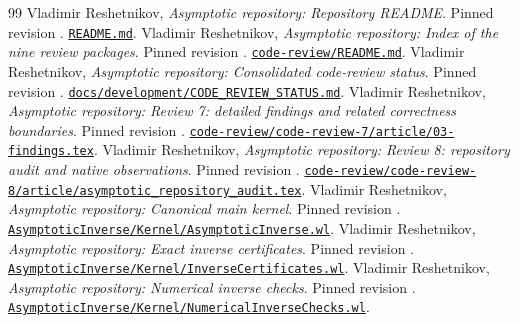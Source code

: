 \begin{thebibliography}{99}
\small
\setlength{\itemsep}{0.4em}
 Vladimir Reshetnikov, \emph{Asymptotic repository: Repository README}. Pinned revision . \href{https://github.com/VladimirReshetnikov/Asymptotic/blob/921387e5ba1239bfda96e63e64e89bf63d9c41e6/README.md}{\nolinkurl{README.md}}.
 Vladimir Reshetnikov, \emph{Asymptotic repository: Index of the nine review packages}. Pinned revision . \href{https://github.com/VladimirReshetnikov/Asymptotic/blob/921387e5ba1239bfda96e63e64e89bf63d9c41e6/code-review/README.md}{\nolinkurl{code-review/README.md}}.
 Vladimir Reshetnikov, \emph{Asymptotic repository: Consolidated code-review status}. Pinned revision . \href{https://github.com/VladimirReshetnikov/Asymptotic/blob/921387e5ba1239bfda96e63e64e89bf63d9c41e6/docs/development/CODE_REVIEW_STATUS.md}{\nolinkurl{docs/development/CODE_REVIEW_STATUS.md}}.
 Vladimir Reshetnikov, \emph{Asymptotic repository: Review 7: detailed findings and related correctness boundaries}. Pinned revision . \href{https://github.com/VladimirReshetnikov/Asymptotic/blob/921387e5ba1239bfda96e63e64e89bf63d9c41e6/code-review/code-review-7/article/03-findings.tex}{\nolinkurl{code-review/code-review-7/article/03-findings.tex}}.
 Vladimir Reshetnikov, \emph{Asymptotic repository: Review 8: repository audit and native observations}. Pinned revision . \href{https://github.com/VladimirReshetnikov/Asymptotic/blob/921387e5ba1239bfda96e63e64e89bf63d9c41e6/code-review/code-review-8/article/asymptotic_repository_audit.tex}{\nolinkurl{code-review/code-review-8/article/asymptotic_repository_audit.tex}}.
 Vladimir Reshetnikov, \emph{Asymptotic repository: Canonical main kernel}. Pinned revision . \href{https://github.com/VladimirReshetnikov/Asymptotic/blob/921387e5ba1239bfda96e63e64e89bf63d9c41e6/AsymptoticInverse/Kernel/AsymptoticInverse.wl}{\nolinkurl{AsymptoticInverse/Kernel/AsymptoticInverse.wl}}.
 Vladimir Reshetnikov, \emph{Asymptotic repository: Exact inverse certificates}. Pinned revision . \href{https://github.com/VladimirReshetnikov/Asymptotic/blob/921387e5ba1239bfda96e63e64e89bf63d9c41e6/AsymptoticInverse/Kernel/InverseCertificates.wl}{\nolinkurl{AsymptoticInverse/Kernel/InverseCertificates.wl}}.
 Vladimir Reshetnikov, \emph{Asymptotic repository: Numerical inverse checks}. Pinned revision . \href{https://github.com/VladimirReshetnikov/Asymptotic/blob/921387e5ba1239bfda96e63e64e89bf63d9c41e6/AsymptoticInverse/Kernel/NumericalInverseChecks.wl}{\nolinkurl{AsymptoticInverse/Kernel/NumericalInverseChecks.wl}}.

\end{thebibliography}
